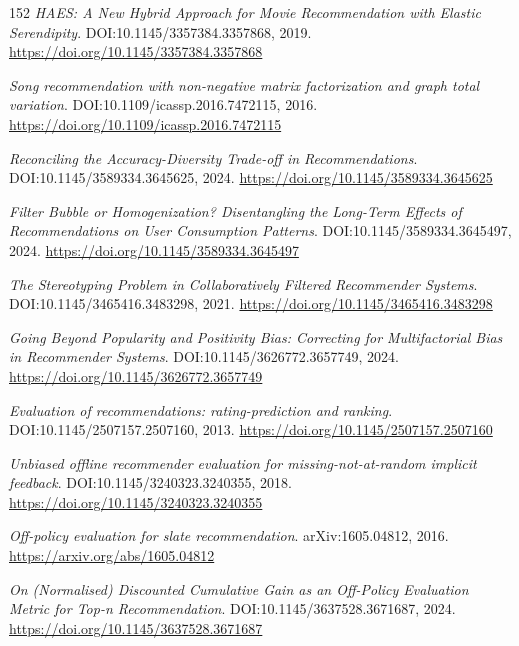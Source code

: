 \documentclass[11pt,a4paper]{article}
\begin{document}
\begin{thebibliography}{152}
\newblock \emph{HAES: A New Hybrid Approach for Movie Recommendation with Elastic Serendipity}.
\newblock DOI:10.1145/3357384.3357868, 2019.
\newblock \url{https://doi.org/10.1145/3357384.3357868}

\newblock \emph{Song recommendation with non-negative matrix factorization and graph total variation}.
\newblock DOI:10.1109/icassp.2016.7472115, 2016.
\newblock \url{https://doi.org/10.1109/icassp.2016.7472115}

\newblock \emph{Reconciling the Accuracy-Diversity Trade-off in Recommendations}.
\newblock DOI:10.1145/3589334.3645625, 2024.
\newblock \url{https://doi.org/10.1145/3589334.3645625}

\newblock \emph{Filter Bubble or Homogenization? Disentangling the Long-Term Effects of Recommendations on User Consumption Patterns}.
\newblock DOI:10.1145/3589334.3645497, 2024.
\newblock \url{https://doi.org/10.1145/3589334.3645497}

\newblock \emph{The Stereotyping Problem in Collaboratively Filtered Recommender Systems}.
\newblock DOI:10.1145/3465416.3483298, 2021.
\newblock \url{https://doi.org/10.1145/3465416.3483298}

\newblock \emph{Going Beyond Popularity and Positivity Bias: Correcting for Multifactorial Bias in Recommender Systems}.
\newblock DOI:10.1145/3626772.3657749, 2024.
\newblock \url{https://doi.org/10.1145/3626772.3657749}

\newblock \emph{Evaluation of recommendations: rating-prediction and ranking}.
\newblock DOI:10.1145/2507157.2507160, 2013.
\newblock \url{https://doi.org/10.1145/2507157.2507160}

\newblock \emph{Unbiased offline recommender evaluation for missing-not-at-random implicit feedback}.
\newblock DOI:10.1145/3240323.3240355, 2018.
\newblock \url{https://doi.org/10.1145/3240323.3240355}

\newblock \emph{Off-policy evaluation for slate recommendation}.
\newblock arXiv:1605.04812, 2016.
\newblock \url{https://arxiv.org/abs/1605.04812}

\newblock \emph{On (Normalised) Discounted Cumulative Gain as an Off-Policy Evaluation Metric for Top-n Recommendation}.
\newblock DOI:10.1145/3637528.3671687, 2024.
\newblock \url{https://doi.org/10.1145/3637528.3671687}


\end{thebibliography}
\end{document}
